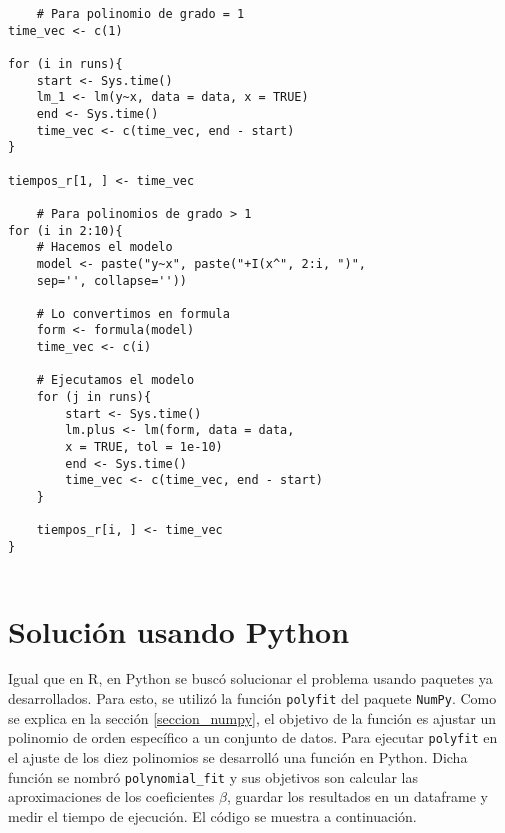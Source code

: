 \begin{verbatim}
	# Para polinomio de grado = 1
time_vec <- c(1)

for (i in runs){
	start <- Sys.time()
	lm_1 <- lm(y~x, data = data, x = TRUE)
	end <- Sys.time()
	time_vec <- c(time_vec, end - start)
}

tiempos_r[1, ] <- time_vec
	
	# Para polinomios de grado > 1
for (i in 2:10){
	# Hacemos el modelo
	model <- paste("y~x", paste("+I(x^", 2:i, ")", 
	sep='', collapse=''))
	
	# Lo convertimos en formula
	form <- formula(model)
	time_vec <- c(i)
	
	# Ejecutamos el modelo
	for (j in runs){
		start <- Sys.time()
		lm.plus <- lm(form, data = data, 
		x = TRUE, tol = 1e-10)
		end <- Sys.time()
		time_vec <- c(time_vec, end - start)
	}
	
	tiempos_r[i, ] <- time_vec
}
		
	\end{verbatim}

\section{Solución usando Python}

Igual que en \textsf{R}, en \textsf{Python} se buscó solucionar el problema usando paquetes ya desarrollados. Para esto, se utilizó la función \texttt{polyfit} del paquete \texttt{NumPy}. Como se explica en la sección \ref{seccion_numpy}, el objetivo de la función es ajustar un polinomio de orden específico a un conjunto de datos. Para ejecutar \texttt{polyfit} en el ajuste de los diez polinomios se desarrolló una función en \textsf{Python}. Dicha función se nombró \texttt{polynomial\_fit} y sus objetivos son calcular las aproximaciones de los coeficientes $\beta$, guardar los resultados en un dataframe y medir el tiempo de ejecución. El código se muestra a continuación. 


